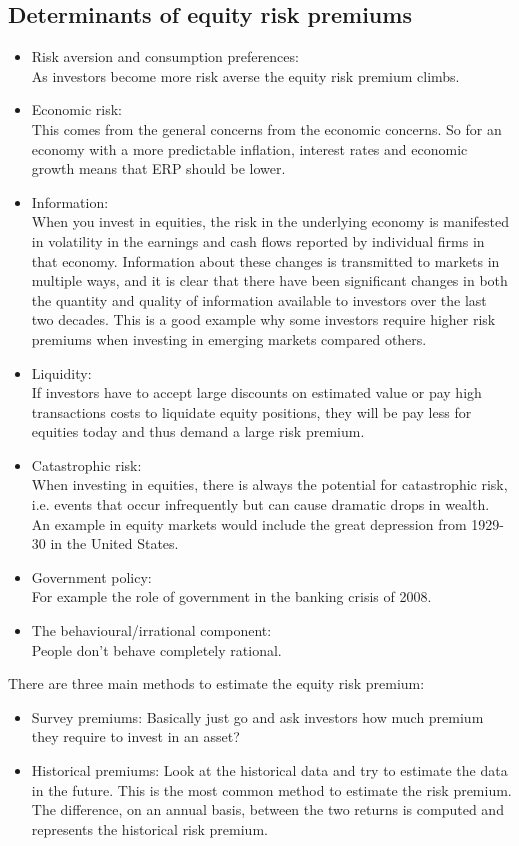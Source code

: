 \documentclass[12 pt]{article}
\begin{document}
\subsection{Determinants of equity risk premiums}
\begin{itemize}
\item Risk aversion and consumption preferences: \\
As investors become more risk averse the equity risk premium climbs. 
\item Economic risk:\\
This comes from the general concerns from the economic concerns. So for an economy with a more predictable inflation, interest rates and economic growth means that ERP should be lower.
\item Information:\\
When you invest in equities, the risk in the underlying economy is manifested in volatility in the earnings and cash flows reported by individual firms in that economy. Information about these changes is transmitted to markets in multiple ways, and it is clear
that there have been significant changes in both the quantity and quality of information available to investors over the last two decades.  This is a good example why some investors require higher risk premiums when investing in emerging markets compared others. 
\item Liquidity:\\
If investors have to accept large discounts on estimated value or pay high transactions costs to liquidate equity positions, they will be pay less for equities today and thus demand a large risk premium.
\item Catastrophic risk: \\
When investing in equities, there is always the potential for catastrophic risk, i.e. events that occur infrequently but can cause dramatic drops in wealth. An example in equity markets would include the great depression from 1929-30 in the United States.
\item Government policy:\\
For example the role of government in the banking crisis of 2008. 
\item The behavioural/irrational component:\\
People don't behave completely rational. 
\end{itemize}
There are three main methods to estimate the equity risk premium: 
\begin{itemize}
\item Survey premiums: Basically just go and ask investors how much premium they require to invest in an asset?
\item Historical premiums: Look at the historical data and try to estimate the data in the future. This is the most common method to estimate the risk premium. The difference, on an annual basis, between the two returns is computed and represents the historical risk premium.
\end{itemize}
\end{document}
